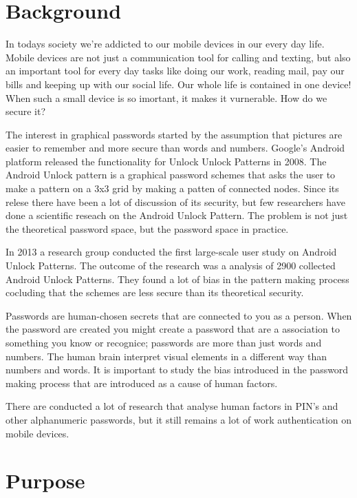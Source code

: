   \clearpage

  \section*{Background}
    In todays society we're addicted to our mobile devices in our every day life. Mobile devices are not just a communication tool for calling and texting, but also an important tool for every day tasks like doing our work, reading mail, pay our bills and keeping up with our social life. Our whole life is contained in one device! When such a small device is so imortant, it makes it vurnerable. How do we secure it?

    The interest in graphical passwords started by the assumption that pictures are easier to remember and more secure than words and numbers. Google's Android platform released the  functionality for Unlock Unlock Patterns in 2008. The Android Unlock pattern is a graphical password schemes that asks the user to make a pattern on a 3x3 grid by making a patten of connected nodes. Since its relese there have been a lot of discussion of its security, but few researchers have done a scientific reseach on the Android Unlock Pattern. The problem is not just the theoretical password space, but the password space in practice.

    In 2013 a research group conducted the first large-scale user study on Android Unlock Patterns. %
    The outcome of the research was a analysis of 2900 collected Android Unlock Patterns. They found a lot of bias in the pattern making process cocluding that the schemes are less secure than its theoretical security.

    Passwords are human-chosen secrets that are connected to you as a person. When the password are created you might create a password that are a association to something you know or recognice; passwords are more than just words and numbers. The human brain interpret visual elements in a different way than numbers and words. It is important to study the bias introduced in the password making process that are introduced as a cause of human factors.

    There are conducted a lot of research that analyse human factors in PIN's and other alphanumeric passwords, but it still remains a lot of work authentication on mobile devices.

    
  
  \section*{Purpose}

